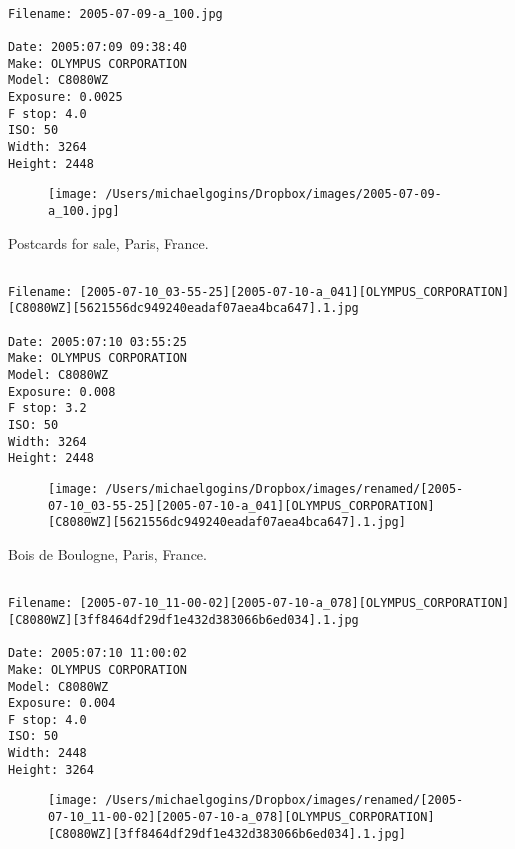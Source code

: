 \clearpage
\onecolumn
\noindent 
\noindent
\begin{lstlisting}

Filename: 2005-07-09-a_100.jpg

Date: 2005:07:09 09:38:40
Make: OLYMPUS CORPORATION
Model: C8080WZ
Exposure: 0.0025
F stop: 4.0
ISO: 50
Width: 3264
Height: 2448
\end{lstlisting}
\clearpage

\begin{figure}
\texttt{[image: /Users/michaelgogins/Dropbox/images/2005-07-09-a\_100.jpg]}
\end{figure}
    
\clearpage
\onecolumn
\noindent Postcards for sale, Paris, France.
\noindent
\begin{lstlisting}

Filename: [2005-07-10_03-55-25][2005-07-10-a_041][OLYMPUS_CORPORATION][C8080WZ][5621556dc949240eadaf07aea4bca647].1.jpg

Date: 2005:07:10 03:55:25
Make: OLYMPUS CORPORATION
Model: C8080WZ
Exposure: 0.008
F stop: 3.2
ISO: 50
Width: 3264
Height: 2448
\end{lstlisting}
\clearpage

\begin{figure}
\texttt{[image: /Users/michaelgogins/Dropbox/images/renamed/[2005-07-10\_03-55-25][2005-07-10-a\_041][OLYMPUS\_CORPORATION][C8080WZ][5621556dc949240eadaf07aea4bca647].1.jpg]}
\end{figure}
    
\clearpage
\onecolumn
\noindent Bois de Boulogne, Paris, France.
\noindent
\begin{lstlisting}

Filename: [2005-07-10_11-00-02][2005-07-10-a_078][OLYMPUS_CORPORATION][C8080WZ][3ff8464df29df1e432d383066b6ed034].1.jpg

Date: 2005:07:10 11:00:02
Make: OLYMPUS CORPORATION
Model: C8080WZ
Exposure: 0.004
F stop: 4.0
ISO: 50
Width: 2448
Height: 3264
\end{lstlisting}
\clearpage

\begin{figure}
\texttt{[image: /Users/michaelgogins/Dropbox/images/renamed/[2005-07-10\_11-00-02][2005-07-10-a\_078][OLYMPUS\_CORPORATION][C8080WZ][3ff8464df29df1e432d383066b6ed034].1.jpg]}
\end{figure}
    
